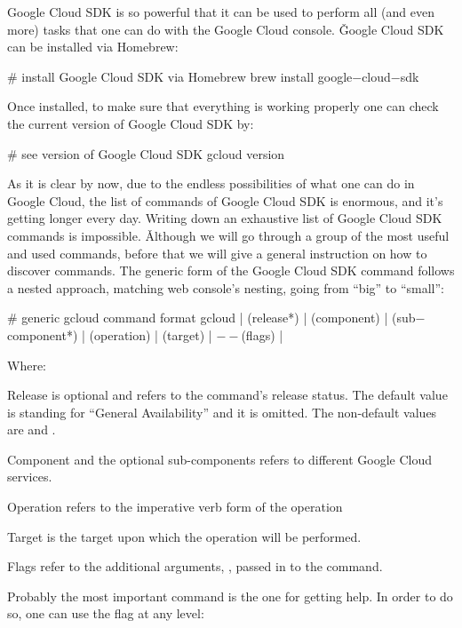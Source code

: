 Google Cloud SDK is so powerful that it can be used to perform all (and even more) tasks that one can do with the
Google Cloud console. \v

Google Cloud SDK can be installed via Homebrew:
\begin{bash}
# install Google Cloud SDK via Homebrew
brew install google$-$cloud$-$sdk
\end{bash}

Once installed, to make sure that everything is working properly one can check the current version of Google Cloud
SDK by:
\begin{bash}
# see version of Google Cloud SDK
gcloud version
\end{bash}

As it is clear by now, due to the endless possibilities of what one can do in Google Cloud, the list of commands of
Google Cloud SDK is enormous, and it's getting longer every day. Writing down an exhaustive list of Google Cloud SDK
commands is impossible. \v

Although we will go through a group of the most useful and used commands, before that we will give a general instruction
on how to discover commands. The generic form of the Google Cloud SDK command follows a nested approach, matching web
console's nesting, going from ``big'' to ``small'':
\begin{bash}
# generic gcloud command format
gcloud | (release*) | (component) | (sub$-$component*) | (operation) | (target) | $--$(flags) |
\end{bash}

Where:
\bit
\item Release is optional and refers to the command's release status. The default value is  standing for
``General Availability'' and it is omitted. The non-default values are  and .
\item Component and the optional sub-components refers to different Google Cloud services.
\item Operation refers to the imperative verb form of the operation
\item Target is the target upon which the operation will be performed.
\item Flags refer to the additional arguments, , passed in to the command.
\eit

Probably the most important command is the one for getting help. In order to do so, one can use the flag 
at any  level:


